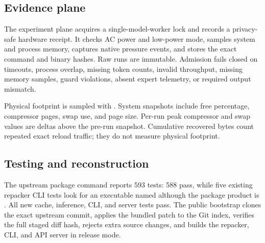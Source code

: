 \subsection{Evidence plane}

The experiment plane acquires a single-model-worker lock and records a
privacy-safe hardware receipt. It checks AC power and low-power mode, samples
system and process memory, captures native pressure events, and stores the
exact command and binary hashes. Raw runs are immutable. Admission fails closed
on timeouts, process overlap, missing token counts, invalid throughput, missing
memory samples, guard violations, absent expert telemetry, or required output
mismatch.

Physical footprint is sampled with
. System snapshots include free
percentage, compressor pages, swap use, and page size. Per-run peak compressor
and swap values are deltas above the pre-run snapshot. Cumulative recovered
bytes count repeated exact reload traffic; they do not measure physical
footprint.

\subsection{Testing and reconstruction}

The upstream package command reports 593 tests: 588 pass, while five existing
repacker CLI tests look for an executable named 
although the package product is . All new cache,
inference, CLI, and server tests pass. The public bootstrap clones the exact
upstream commit, applies the bundled patch to the Git index, verifies the full
staged diff hash, rejects extra source changes, and builds the repacker, CLI,
and API server in release mode.
